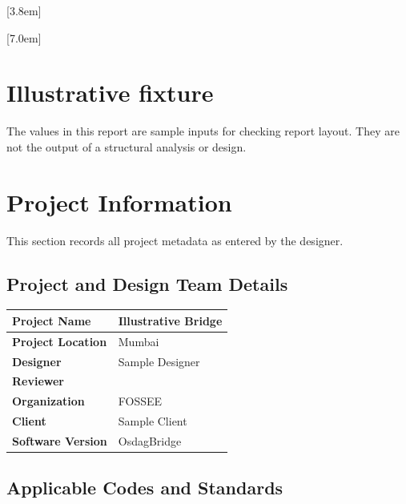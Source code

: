 \documentclass[12pt,a4paper]{report}
\numberwithin{table}{chapter}
\numberwithin{figure}{chapter}
\begin{document}
[3.8em]
  {\normalfont}
  {\contentslabel{2.3em}}
  {\hspace*{-2.3em}}
  {\hfill\contentspage}

[7.0em]
  {\normalfont}
  {\contentslabel{3.2em}}
  {\hspace*{-3.2em}}
  {\hfill\contentspage}

\newpage
\renewcommand{\contentsname}{\centering\Large\bfseries Table of Contents}
\tableofcontents

\chapter*{Illustrative fixture}
The values in this report are sample inputs for checking report layout. They are not the output of a structural analysis or design.

\chapter{Project Information}

This section records all project metadata as entered by the designer.

\section{Project and Design Team Details}
\label{sec:project-details}

\begin{tabular}{|L{5.5cm}|L{8.5cm}|}
\hline
\textbf{Project Name} & Illustrative Bridge \\
\hline
\textbf{Project Location} & Mumbai \\
\hline
\textbf{Designer} & Sample Designer \\
\hline
\textbf{Reviewer} &  \\
\hline
\textbf{Organization} & FOSSEE \\
\hline
\textbf{Client} & Sample Client \\
\hline
\textbf{Software Version} & OsdagBridge \\
\hline
\end{tabular}


\section{Applicable Codes and Standards}
\label{sec:codes}
\end{document}
